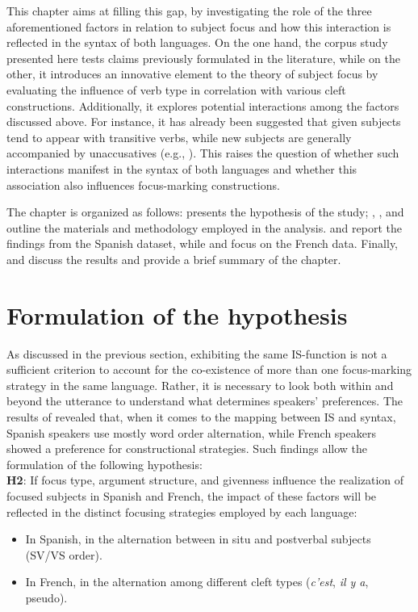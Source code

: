 This chapter aims at filling this gap, by investigating the role of the three aforementioned factors in relation to subject focus and how this interaction is reflected in the syntax of both languages. On the one hand, the corpus study presented here tests claims previously formulated in the literature, while on the other, it introduces an innovative element to the theory of subject focus by evaluating the influence of verb type in correlation with various cleft constructions. Additionally, it explores potential interactions among the factors discussed above. For instance, it has already been suggested that given subjects tend to appear with transitive verbs, while new subjects are generally accompanied by unaccusatives (e.g., \cite{du2003preferred}). This raises the question of whether such interactions manifest in the syntax of both languages and whether this association also influences focus-marking constructions.

The chapter is organized as follows:  presents the hypothesis of the study; , , and  outline the materials and methodology employed in the analysis.  and  report the findings from the Spanish dataset, while  and  focus on the French data. Finally,  and  discuss the results and provide a brief summary of the chapter.

\section{Formulation of the hypothesis} \label{sub:6.2}
As discussed in the previous section, exhibiting the same IS-function is not a sufficient criterion to account for the co-existence of more than one focus-marking strategy in the same language. Rather, it is necessary to look both within and beyond the utterance to understand what determines speakers' preferences. The results of  revealed that, when it comes to the mapping between IS and syntax, Spanish speakers use mostly word order alternation, while French speakers showed a preference for constructional strategies. Such findings allow the formulation of the following hypothesis:\\

\ea \label{ex:5:1}
\textbf{H2}: If focus type, argument structure, and givenness influence the realization of focused subjects in Spanish and French, the impact of these factors will be reflected in the distinct focusing strategies employed by each language:
\begin{itemize}
    \item In Spanish, in the alternation between in situ and postverbal subjects (SV/VS order).
    \item In French, in the alternation among different cleft types (\textit{c’est}, \textit{il y a}, pseudo).
\end{itemize}
\z



